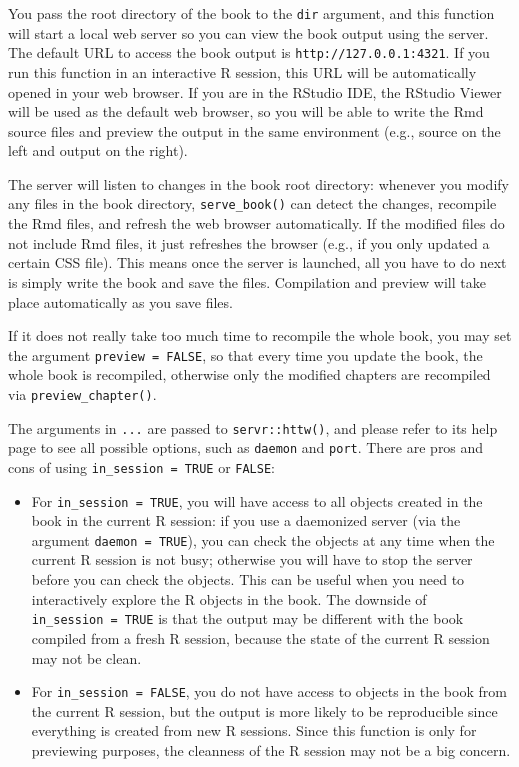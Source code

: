 \documentclass[
  12pt,
]{krantz}
\providecommand{\tightlist}{%
  \setlength{\itemsep}{0pt}\setlength{\parskip}{0pt}}
\theoremstyle{definition}
\theoremstyle{definition}
\theoremstyle{definition}
\theoremstyle{definition}
\theoremstyle{remark}
\begin{document}
You pass the root directory of the book to the \texttt{dir} argument, and this function will start a local web server so you can view the book output using the server. The default URL to access the book output is \texttt{http://127.0.0.1:4321}. If you run this function in an interactive R session, this URL will be automatically opened in your web browser. If you are in the RStudio IDE, the RStudio Viewer will be used as the default web browser, so you will be able to write the Rmd source files and preview the output in the same environment (e.g., source on the left and output on the right).

The server will listen to changes in the book root directory: whenever you modify any files in the book directory, \texttt{serve\_book()} can detect the changes, recompile the Rmd files, and refresh the web browser automatically. If the modified files do not include Rmd files, it just refreshes the browser (e.g., if you only updated a certain CSS file). This means once the server is launched, all you have to do next is simply write the book and save the files. Compilation and preview will take place automatically as you save files.

If it does not really take too much time to recompile the whole book, you may set the argument \texttt{preview\ =\ FALSE}, so that every time you update the book, the whole book is recompiled, otherwise only the modified chapters are recompiled via \texttt{preview\_chapter()}.

The arguments in \texttt{...} are passed to \texttt{servr::httw()}, and please refer to its help page to see all possible options, such as \texttt{daemon} and \texttt{port}. There are pros and cons of using \texttt{in\_session\ =\ TRUE} or \texttt{FALSE}:

\begin{itemize}
\tightlist
\item
  For \texttt{in\_session\ =\ TRUE}, you will have access to all objects created in the book in the current R session: if you use a daemonized server (via the argument \texttt{daemon\ =\ TRUE}), you can check the objects at any time when the current R session is not busy; otherwise you will have to stop the server before you can check the objects. This can be useful when you need to interactively explore the R objects in the book. The downside of \texttt{in\_session\ =\ TRUE} is that the output may be different with the book compiled from a fresh R session, because the state of the current R session may not be clean.
\item
  For \texttt{in\_session\ =\ FALSE}, you do not have access to objects in the book from the current R session, but the output is more likely to be reproducible since everything is created from new R sessions. Since this function is only for previewing purposes, the cleanness of the R session may not be a big concern.
\end{itemize}
\end{document}
